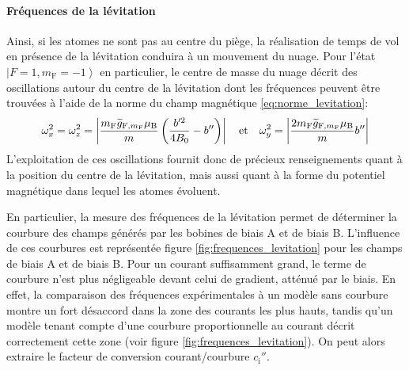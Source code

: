 \paragraph*{Fréquences de la lévitation}
Ainsi, si les atomes ne sont pas au centre du piège, la réalisation de temps de vol en présence de la lévitation conduira à un mouvement du nuage. Pour l'état $\left| F=1, m_{\mathrm{F}}=-1 \right\rangle$ en particulier, le centre de masse du nuage décrit des oscillations autour du centre de la lévitation dont les fréquences peuvent être trouvées à l'aide de la norme du champ magnétique \ref{eq:norme_levitation}:
\begin{equation}
\omega_x^2=\omega_z^2=\left| \frac{m_{\mathrm{F}} \widetilde{g}_{\mathrm{F},m_{\mathrm{F}}} \mu_{\text{B}}}{m} \left( \frac{b'^2}{4 B_0} - b'' \right) \right|
\quad \text{et} \quad
\omega_y^2= \left| \frac{2 m_{\mathrm{F}} \widetilde{g}_{\mathrm{F},m_{\mathrm{F}}} \mu_{\text{B}} }{m} b'' \right|
\label{eq:frequences_leviation}
\end{equation}
L'exploitation de ces oscillations fournit donc de précieux renseignements quant à la position du centre de la lévitation, mais aussi quant à la forme du potentiel magnétique dans lequel les atomes évoluent. 

En particulier, la mesure des fréquences de la lévitation permet de déterminer la courbure des champs générés par les bobines de biais A et de biais B. L'influence de ces courbures est représentée figure \ref{fig:frequences_levitation} pour les champs de biais A et de biais B. Pour un courant suffisamment grand, le terme de courbure n'est plus négligeable devant celui de gradient, atténué par le biais. En effet, la comparaison des fréquences expérimentales à un modèle sans courbure montre un fort désaccord dans la zone des courants les plus hauts, tandis qu'un modèle tenant compte d'une courbure proportionnelle au courant décrit correctement cette zone (voir figure \ref{fig:frequences_levitation}). On peut alors extraire le facteur de conversion courant/courbure $c_{\mathrm{i}}''$.




